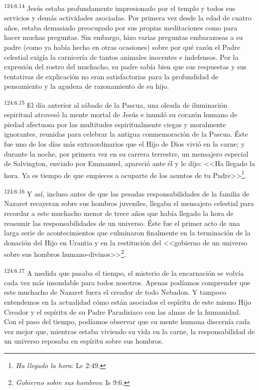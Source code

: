 \par 
\textsuperscript{124:6.14} Jesús estaba profundamente impresionado por el templo y todos sus servicios y demás actividades asociadas. Por primera vez desde la edad de cuatro años, estaba demasiado preocupado por sus propias meditaciones como para hacer muchas preguntas. Sin embargo, hizo varias preguntas embarazosas a su padre (como ya había hecho en otras ocasiones) sobre por qué razón el Padre celestial exigía la carnicería de tantos animales inocentes e indefensos. Por la expresión del rostro del muchacho, su padre sabía bien que sus respuestas y sus tentativas de explicación no eran satisfactorias para la profundidad de pensamiento y la agudeza de razonamiento de su hijo.

\par 
\textsuperscript{124:6.15} El día anterior al sábado de la Pascua, una oleada de iluminación espiritual atravesó la mente mortal de Jesús e inundó su corazón humano de piedad afectuosa por las multitudes espiritualmente ciegas y moralmente ignorantes, reunidas para celebrar la antigua conmemoración de la Pascua. Éste fue uno de los días más extraordinarios que el Hijo de Dios vivió en la carne; y durante la noche, por primera vez en su carrera terrestre, un mensajero especial de Salvington, enviado por Emmanuel, apareció ante él y le dijo: <<Ha llegado la hora. Ya es tiempo de que empieces a ocuparte de los asuntos de tu Padre>>\footnote{\textit{Ha llegado la hora}: Lc 2:49.}.

\par 
\textsuperscript{124:6.16} Y así, incluso antes de que las pesadas responsabilidades de la familia de Nazaret recayeran sobre sus hombros juveniles, llegaba el mensajero celestial para recordar a este muchacho menor de trece años que había llegado la hora de reasumir las responsabilidades de un universo. Éste fue el primer acto de una larga serie de acontecimientos que culminaron finalmente en la terminación de la donación del Hijo en Urantia y en la restitución del <<gobierno de un universo sobre sus hombros humano-divinos>>\footnote{\textit{Gobierno sobre sus hombros}: Is 9:6.}.

\par 
\textsuperscript{124:6.17} A medida que pasaba el tiempo, el misterio de la encarnación se volvía cada vez más insondable para todos nosotros. Apenas podíamos comprender que este muchacho de Nazaret fuera el creador de todo Nebadon. Y tampoco entendemos en la actualidad cómo están asociados el espíritu de este mismo Hijo Creador y el espíritu de su Padre Paradisiaco con las almas de la humanidad. Con el paso del tiempo, podíamos observar que su mente humana discernía cada vez mejor que, mientras estaba viviendo su vida en la carne, la responsabilidad de un universo reposaba en espíritu sobre sus hombros.

